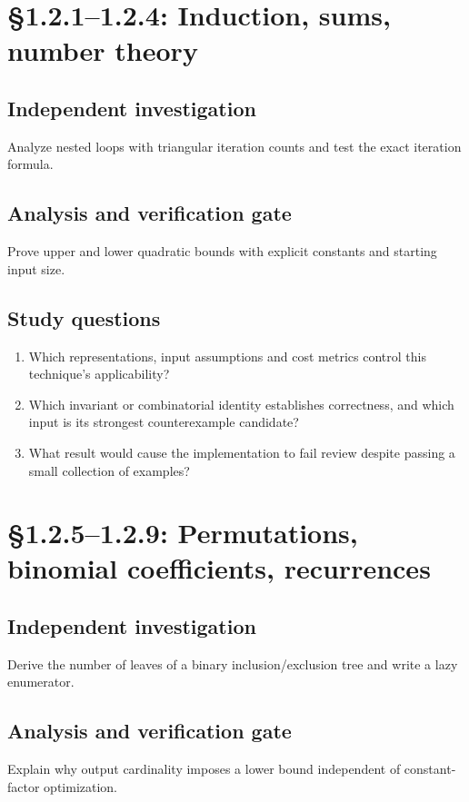 \documentclass[11pt,letterpaper]{article}
\begin{document}
\section{\S 1.2.1--1.2.4: Induction, sums, number theory}
\subsection{Independent investigation}
Analyze nested loops with triangular iteration counts and test the exact iteration formula.
\subsection{Analysis and verification gate}
Prove upper and lower quadratic bounds with explicit constants and starting input size.
\subsection{Study questions}
\begin{enumerate}
\item Which representations, input assumptions and cost metrics control this technique's applicability?
\item Which invariant or combinatorial identity establishes correctness, and which input is its strongest counterexample candidate?
\item What result would cause the implementation to fail review despite passing a small collection of examples?
\end{enumerate}

\section{\S 1.2.5--1.2.9: Permutations, binomial coefficients, recurrences}
\subsection{Independent investigation}
Derive the number of leaves of a binary inclusion/exclusion tree and write a lazy enumerator.
\subsection{Analysis and verification gate}
Explain why output cardinality imposes a lower bound independent of constant-factor optimization.
\end{document}
